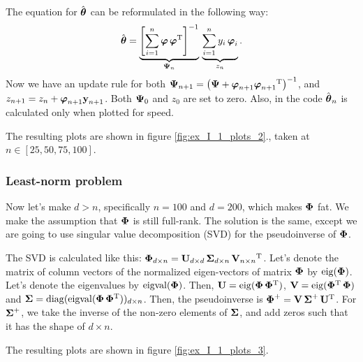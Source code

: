 The equation for $\hat{\v{\theta}}$ can be reformulated in the following way:
\begin{equation}
	\hat{\v{\theta}} = \underbrace{\left[\sum\limits_{i=1}^n{\v{\varphi}\,\v{\varphi}\T}\right]^{-1}}_{\v{\Psi}_n}\,
	\underbrace{\sum\limits_{i=1}^n{y_{i}\,\v{\varphi}_{i} }}_{z_n}.
\end{equation}
Now we have an update rule for both $\v{\Psi}_{n+1} = \brc{\v{\Psi} + \v{\varphi}_{n+1}\v{\varphi}_{n+1}\T}^{-1}$, and $z_{n+1} = z_n + \v{\varphi}_{n+1}\v{y}_{n+1}$.
Both $\v{\Psi}_0$ and $z_0$ are set to zero. 
Also, in the code $\hat{\v{\theta}}_n$ is calculated only when plotted for speed.

The resulting plots are shown in figure \ref{fig:ex_I_1_plots_2}.,
taken at $n\in[25, 50, 75, 100]$.

\subsubsection{Least-norm problem}

Now let's make $d>n$, specifically $n=100$ and $d=200$, which makes $\v{\Phi}$ fat.
We make the assumption that $\v{\Phi}$ is still full-rank.
The solution is the same, except we are going to use singular value decomposition (SVD)
for the pseudoinverse of $\v{\Phi}$.

The SVD is calculated like this: $\v{\Phi}_{d\times n}=\v{U}_{d\times d}\,\v{\Sigma}_{d\times n}\,\v{V}_{n\times n}\T$. Let's denote the matrix of column vectors of the normalized eigen-vectors 
of matrix $\v{\Phi}$ by $\eig(\v{\Phi})$. Let's denote the eigenvalues by $\operatorname{eigval}(\v{\Phi})$.
Then, $\v{U} = \eig(\v{\Phi}\,\v{\Phi}\T)$, $\v{V} = \eig(\v{\Phi}\T\,\v{\Phi})$ and
$\v{\Sigma} = \diag(\operatorname{eigval}(\v{\Phi}\,\v{\Phi}\T))_{d\times n}$.
Then, the pseudoinverse is $\v{\Phi}^+=\v{V}\,\v{\Sigma}^+\,\v{U}\T$.
For $\v{\Sigma}^+$, we take the inverse of the non-zero elements of $\v{\Sigma}$, and add
zeros such that it has the shape of $d\times n$.

The resulting plots are shown in figure \ref{fig:ex_I_1_plots_3}.

